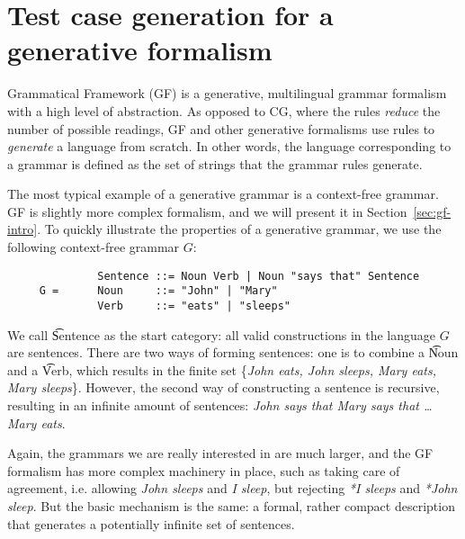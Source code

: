 

\section{Test case generation for a generative formalism}

Grammatical Framework (GF) \cite{ranta2011gfbook} is a generative, multilingual grammar formalism with a high level of abstraction.
As opposed to CG, where the rules \emph{reduce} the number of possible readings, GF and other generative formalisms use rules to \emph{generate} a language from scratch. In other words, the language corresponding to a grammar is defined as the set of strings that the grammar rules generate.

The most typical example of a generative grammar is a context-free grammar. GF is slightly more complex formalism, and we will present it in Section~\ref{sec:gf-intro}. To quickly illustrate the properties of a generative grammar, we use the following context-free grammar $G$:

\begin{verbatim}
              Sentence ::= Noun Verb | Noun "says that" Sentence
     G =      Noun     ::= "John" | "Mary"
              Verb     ::= "eats" | "sleeps"
\end{verbatim}

We call \t{Sentence} as the start category: all valid constructions in the language $G$ are sentences. There are two ways of forming sentences: one is to combine a \t{Noun} and a \t{Verb}, which results in the finite set \{\emph{John eats, John sleeps, Mary eats, Mary sleeps}\}. However, the second way of constructing a sentence is recursive, resulting in an infinite amount of sentences: \emph{John says that Mary says that \dots Mary eats}.

Again, the grammars we are really interested in are much larger, and the GF formalism has more complex machinery in place, such as taking care of agreement, i.e. allowing \emph{John sleeps} and \emph{I sleep}, but rejecting \emph{*I sleeps} and \emph{*John sleep}. But the basic mechanism is the same: a formal, rather compact description that generates a potentially infinite set of sentences.

